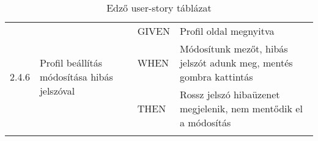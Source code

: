 \begin{center}
\begin{longtable}{ | p{} | p{} | p{} | p{} | }
			\\
			\hline

			\multirow{3}{*}{2.4.6} 
			& \multirow{3}{=}{Profil beállítás módosítása hibás jelszóval} 
			& GIVEN 
			& Profil oldal megnyitva \\
			\cline{3-4}
			& & WHEN 
			& Módosítunk mezőt, hibás jelszót adunk meg, mentés gombra kattintás \\
			\cline{3-4}
			& & THEN 
			& Rossz jelszó hibaüzenet megjelenik, nem mentődik el a módosítás \\
			\hline

		

			\caption{Edző user-story táblázat}
			\label{tab:userstoryedzo}       
	\end{longtable}
\end{center}



